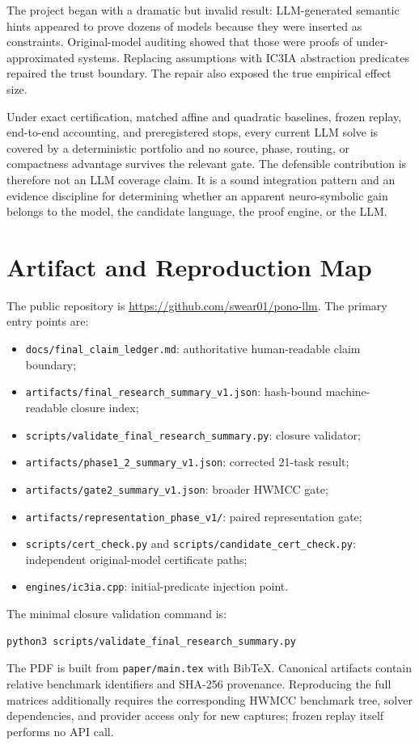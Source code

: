 \documentclass[10pt]{article}
\newcommand{\icthreeia}{\textsc{IC3IA}}
\newcommand{\code}[1]{\texttt{#1}}
\begin{document}
The project began with a dramatic but invalid result: LLM-generated semantic
hints appeared to prove dozens of models because they were inserted as
constraints.  Original-model auditing showed that those were proofs of
under-approximated systems.  Replacing assumptions with \icthreeia{}
abstraction predicates repaired the trust boundary.  The repair also exposed
the true empirical effect size.

Under exact certification, matched affine and quadratic baselines, frozen
replay, end-to-end accounting, and preregistered stops, every current LLM solve
is covered by a deterministic portfolio and no source, phase, routing, or
compactness advantage survives the relevant gate.  The defensible contribution
is therefore not an LLM coverage claim.  It is a sound integration pattern and
an evidence discipline for determining whether an apparent neuro-symbolic gain
belongs to the model, the candidate language, the proof engine, or the LLM.

\appendix
\section{Artifact and Reproduction Map}

The public repository is
\url{https://github.com/swear01/pono-llm}.  The primary entry points are:
\begin{itemize}
  \item \code{docs/final\_claim\_ledger.md}: authoritative human-readable claim
        boundary;
  \item \code{artifacts/final\_research\_summary\_v1.json}: hash-bound machine-
        readable closure index;
  \item \code{scripts/validate\_final\_research\_summary.py}: closure validator;
  \item \code{artifacts/phase1\_2\_summary\_v1.json}: corrected 21-task result;
  \item \code{artifacts/gate2\_summary\_v1.json}: broader HWMCC gate;
  \item \code{artifacts/representation\_phase\_v1/}: paired representation gate;
  \item \code{scripts/cert\_check.py} and
        \code{scripts/candidate\_cert\_check.py}: independent original-model
        certificate paths;
  \item \code{engines/ic3ia.cpp}: initial-predicate injection point.
\end{itemize}

The minimal closure validation command is:
\begin{verbatim}
python3 scripts/validate_final_research_summary.py
\end{verbatim}
The PDF is built from \code{paper/main.tex} with BibTeX.  Canonical artifacts
contain relative benchmark identifiers and SHA-256 provenance.  Reproducing
the full matrices additionally requires the corresponding HWMCC benchmark
tree, solver dependencies, and provider access only for new captures; frozen
replay itself performs no API call.
\end{document}
